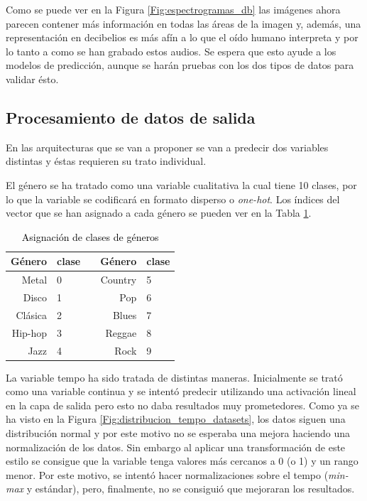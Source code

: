 Como se puede ver en la Figura \ref{Fig:espectrogramas_db} las imágenes ahora parecen contener más información en todas las áreas de la imagen y, además, una representación en decibelios es más afín a lo que el oído humano interpreta y por lo tanto a como se han grabado estos audios. Se espera que esto ayude a los modelos de predicción, aunque se harán pruebas con los dos tipos de datos para validar ésto.

\subsection{Procesamiento de datos de salida}\label{sec:target_process}

\noindent En las arquitecturas que se van a proponer se van a predecir dos variables distintas y éstas requieren su trato individual. 

El género se ha tratado como una variable cualitativa la cual tiene 10 clases, por lo que la variable se codificará en formato disperso o \textit{one-hot}. Los índices del vector que se han asignado a cada género se pueden ver en la Tabla \ref{tab:genre_classes}.

\begin{table}
\centering
\begin{tabular}{rllrl}
\hline
\textbf{Género} & \textbf{clase} &  & \textbf{Género} & \textbf{clase} \\ \hline
Metal			&	0			& 	&	Country			& 5  \\ 
Disco			&	1			& 	&	Pop			  & 6  \\ 
Clásica      	&	2			& 	&	Blues			& 7  \\ 
Hip-hop			&	3			& 	&	Reggae			& 8  \\ 
Jazz 			&	4			& 	&	Rock			& 9  \\ \hline
\end{tabular}
\caption{\textcolor{black}{Asignación de clases de géneros}}
\label{tab:genre_classes}
\end{table}

La variable tempo ha sido tratada de distintas maneras. Inicialmente se trató como una variable continua y se intentó predecir utilizando una activación lineal en la capa de salida pero esto no daba resultados muy prometedores. Como ya se ha visto en la Figura \ref{Fig:distribucion_tempo_datasets}, los datos siguen una distribución normal y por este motivo no se esperaba una mejora haciendo una normalización de los datos. Sin embargo al aplicar una transformación de este estilo se consigue que la variable tenga valores más cercanos a 0 (o 1) y un rango menor. Por este motivo, se intentó hacer normalizaciones sobre el tempo (\textit{min-max} y  estándar), pero, finalmente, no se consiguió que mejoraran los resultados.

